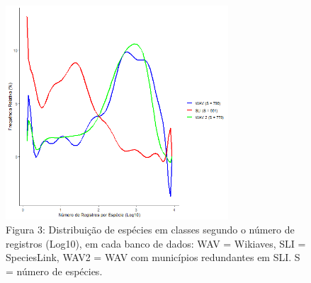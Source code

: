 \texto

\begin{figure}[h!]
\centering
\includegraphics[height = 8cm]{Imagens/133.png}
\\{\scriptsize Figura 3: Distribuição de espécies em classes segundo o número de registros (Log10), em cada banco de dados: WAV = Wikiaves, SLI = SpeciesLink, WAV2 = WAV com municípios redundantes em SLI. S = número de espécies.}
\end{figure}

\newpage
